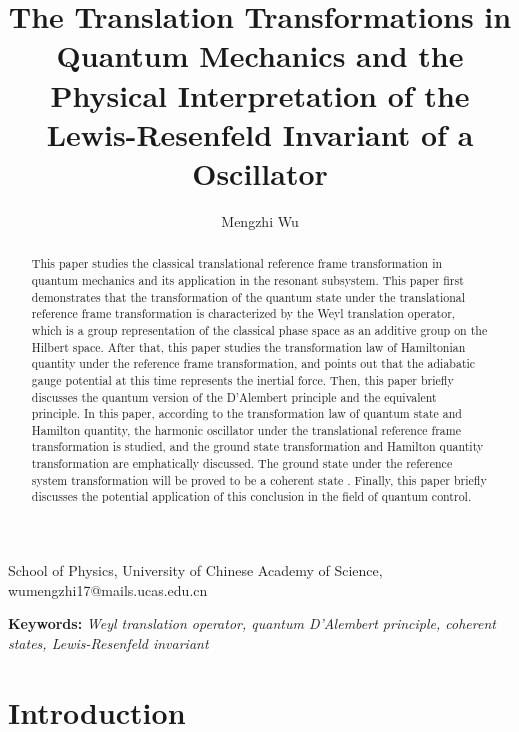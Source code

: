 \documentclass{article}
\title{The Translation Transformations in Quantum Mechanics and the Physical Interpretation of the Lewis-Resenfeld Invariant of a Oscillator}
\author{Mengzhi Wu}
\date{}
\begin{document}
    
    \maketitle

    \begin{center}
        \begin{small}
            School of Physics, University of Chinese Academy of Science, \\
            wumengzhi17@mails.ucas.edu.cn
        \end{small}
    \end{center}

    \bigskip

    \begin{abstract}
        This paper studies the classical translational reference frame transformation in quantum mechanics and its application in the resonant subsystem. This paper first demonstrates that the transformation of the quantum state under the translational reference frame transformation is characterized by the Weyl translation operator, which is a group representation of the classical phase space as an additive group on the Hilbert space. After that, this paper studies the transformation law of Hamiltonian quantity under the reference frame transformation, and points out that the adiabatic gauge potential at this time represents the inertial force. Then, this paper briefly discusses the quantum version of the D'Alembert principle and the equivalent principle. In this paper, according to the transformation law of quantum state and Hamilton quantity, the harmonic oscillator under the translational reference frame transformation is studied, and the ground state transformation and Hamilton quantity transformation are emphatically discussed. The ground state under the reference system transformation will be proved to be a coherent state . Finally, this paper briefly discusses the potential application of this conclusion in the field of quantum control.
    \end{abstract}

    \begin{small}
        {\bf Keywords:} {\em Weyl translation operator, quantum D'Alembert principle, coherent states, Lewis-Resenfeld invariant}
    \end{small}

    \section{Introduction}
\end{document}

